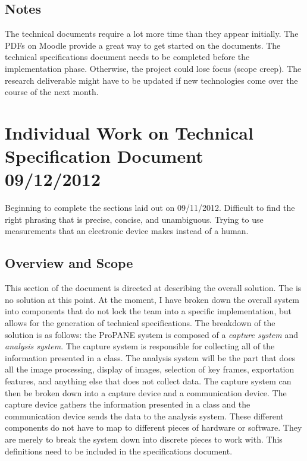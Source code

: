 \documentclass[]{article}
\begin{document}
			\subsection{Notes}
				The technical documents require a lot more time than they appear initially. The PDFs on Moodle provide a great way to get started on the documents. The technical specifications document needs to be completed before the implementation phase. Otherwise, the project could lose focus (scope creep). The research deliverable might have to be updated if new technologies come over the course of the next month.
	
	\section{Individual Work on Technical Specification Document 09/12/2012}
		Beginning to complete the sections laid out on 09/11/2012. Difficult to find the right phrasing that is precise, concise, and unambiguous. Trying to use measurements that an electronic device makes instead of a human. \\
		
		\subsection{Overview and Scope}
			This section of the document is directed at describing the overall solution. The is no solution at this point. At the moment, I have broken down the overall system into components that do not lock the team into a specific implementation, but allows for the generation of technical specifications. The breakdown of the solution is as follows: the ProPANE system is composed of a \emph{capture system} and \emph{analysis system}. The capture system is responsible for collecting all of the information presented in a class. The analysis system will be the part that does all the image processing, display of images, selection of key frames, exportation features, and anything else that does not collect data. The capture system can then be broken down into a capture device and a communication device. The capture device gathers the information presented in a class and the communication device sends the data to the analysis system. These different components do not have to map to different pieces of hardware or software. They are merely to break the system down into discrete pieces to work with. This definitions need to be included in the specifications document. 
			
\end{document}
